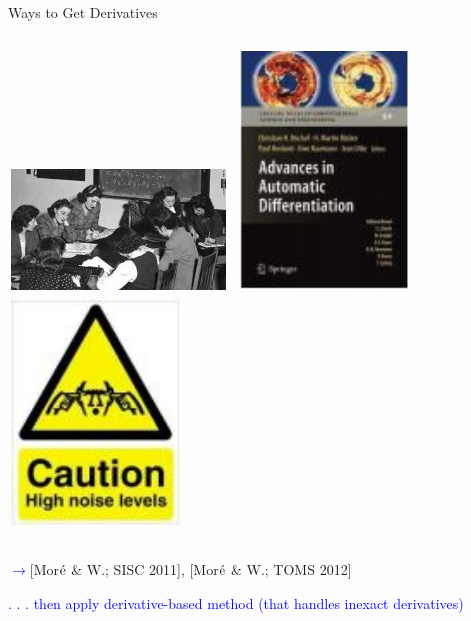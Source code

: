 \documentclass[handout,aspectratio=54]{beamer}
\numberwithin{theorem}{section}
\begin{document}
\begin{frame}{Ways to Get Derivatives}
\begin{columns}
\includegraphics[width=\textwidth]{fig/6-1.jpg}
\includegraphics[width=0.4\textwidth]{fig/6-2.jpg}
\includegraphics[width=0.4\textwidth]{fig/6-3.jpg}
\end{columns}

\centerline{
\scriptsize{
\textcolor{blue}{$\rightarrow$}\textcolor[RGB]{128,0,128}{[Mor$\acute{\textup{e}}$ \& W.; SISC 2011], [Mor$\acute{\textup{e}}$ \& W.; TOMS 2012]}
}}
\centerline{
\footnotesize{
\textcolor{blue}{. . . then apply derivative-based method (that handles inexact derivatives)}
}}
\end{frame}
\end{document}
